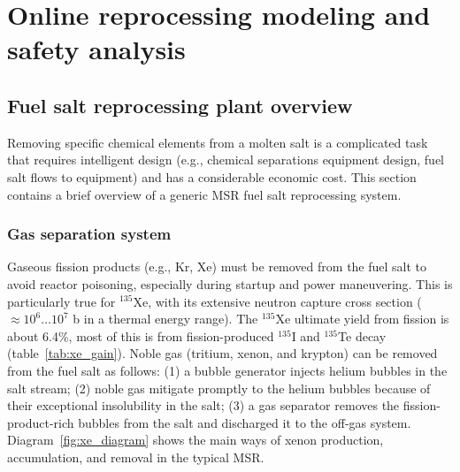 \chapter[Online reprocessing modeling and safety analysis]{Online reprocessing 
modeling and safety analysis}
\section{Fuel salt reprocessing plant overview} \label{sec:reproc-plant}
Removing specific chemical elements from a molten salt is a complicated 
task that requires intelligent design (e.g., chemical separations equipment 
design, fuel salt flows to equipment) and has a considerable economic cost. 
This section contains a brief overview of a generic \gls{MSR} fuel salt 
reprocessing system.

\subsection{Gas separation system}
Gaseous fission products (e.g., Kr, Xe) must be removed from the fuel salt 
to avoid reactor poisoning, especially during startup and power maneuvering. 
This is particularly true for $^{135}$Xe, with its extensive neutron capture 
cross section ($\approx10^6\dots10^7$ b in a thermal energy range). The 
$^{135}$Xe ultimate yield from fission is about 6.4\%, most of this is from 
fission-produced $^{135}$I and $^{135}$Te decay (table~\ref{tab:xe_gain}). 
Noble gas (tritium, xenon, and 
krypton) can be removed from the fuel salt as follows: (1) a bubble generator 
injects helium bubbles in the salt stream; (2) noble gas mitigate promptly 
to the helium bubbles because of their exceptional insolubility in the salt; 
(3) a gas separator removes the fission-product-rich bubbles from
the salt 
and discharged it to the off-gas system. Diagram~\ref{fig:xe_diagram} shows 
the main ways of xenon production, accumulation, and removal in the typical 
\gls{MSR}.
